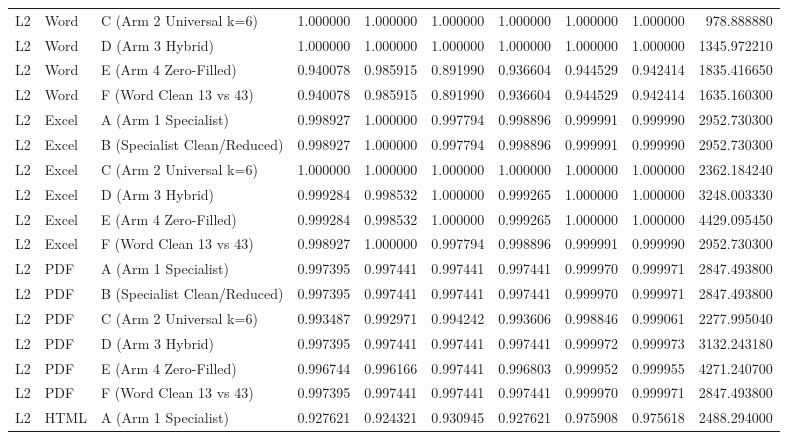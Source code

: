 \begin{tabular}{lllrrrrrrr}
L2 & Word & C (Arm 2 Universal k=6) & 1.000000 & 1.000000 & 1.000000 & 1.000000 & 1.000000 & 1.000000 & 978.888880 \\
L2 & Word & D (Arm 3 Hybrid) & 1.000000 & 1.000000 & 1.000000 & 1.000000 & 1.000000 & 1.000000 & 1345.972210 \\
L2 & Word & E (Arm 4 Zero-Filled) & 0.940078 & 0.985915 & 0.891990 & 0.936604 & 0.944529 & 0.942414 & 1835.416650 \\
L2 & Word & F (Word Clean 13 vs 43) & 0.940078 & 0.985915 & 0.891990 & 0.936604 & 0.944529 & 0.942414 & 1635.160300 \\
L2 & Excel & A (Arm 1 Specialist) & 0.998927 & 1.000000 & 0.997794 & 0.998896 & 0.999991 & 0.999990 & 2952.730300 \\
L2 & Excel & B (Specialist Clean/Reduced) & 0.998927 & 1.000000 & 0.997794 & 0.998896 & 0.999991 & 0.999990 & 2952.730300 \\
L2 & Excel & C (Arm 2 Universal k=6) & 1.000000 & 1.000000 & 1.000000 & 1.000000 & 1.000000 & 1.000000 & 2362.184240 \\
L2 & Excel & D (Arm 3 Hybrid) & 0.999284 & 0.998532 & 1.000000 & 0.999265 & 1.000000 & 1.000000 & 3248.003330 \\
L2 & Excel & E (Arm 4 Zero-Filled) & 0.999284 & 0.998532 & 1.000000 & 0.999265 & 1.000000 & 1.000000 & 4429.095450 \\
L2 & Excel & F (Word Clean 13 vs 43) & 0.998927 & 1.000000 & 0.997794 & 0.998896 & 0.999991 & 0.999990 & 2952.730300 \\
L2 & PDF & A (Arm 1 Specialist) & 0.997395 & 0.997441 & 0.997441 & 0.997441 & 0.999970 & 0.999971 & 2847.493800 \\
L2 & PDF & B (Specialist Clean/Reduced) & 0.997395 & 0.997441 & 0.997441 & 0.997441 & 0.999970 & 0.999971 & 2847.493800 \\
L2 & PDF & C (Arm 2 Universal k=6) & 0.993487 & 0.992971 & 0.994242 & 0.993606 & 0.998846 & 0.999061 & 2277.995040 \\
L2 & PDF & D (Arm 3 Hybrid) & 0.997395 & 0.997441 & 0.997441 & 0.997441 & 0.999972 & 0.999973 & 3132.243180 \\
L2 & PDF & E (Arm 4 Zero-Filled) & 0.996744 & 0.996166 & 0.997441 & 0.996803 & 0.999952 & 0.999955 & 4271.240700 \\
L2 & PDF & F (Word Clean 13 vs 43) & 0.997395 & 0.997441 & 0.997441 & 0.997441 & 0.999970 & 0.999971 & 2847.493800 \\
L2 & HTML & A (Arm 1 Specialist) & 0.927621 & 0.924321 & 0.930945 & 0.927621 & 0.975908 & 0.975618 & 2488.294000 \\

\end{tabular}
